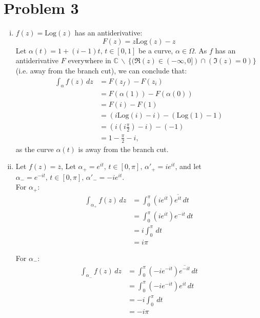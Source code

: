 \documentclass[a4paper, titlepage, DIV=14]{scrartcl}
\newcommand{\Log}{\text{Log}}
\begin{document}
    \section*{Problem 3}
    \begin{enumerate}[i)]
        \item 
        $f(z) = \Log(z)$ has an antiderivative:
        \begin{equation*}
            F(z) = z\Log(z) - z
        \end{equation*}
        Let $\alpha(t) = 1 + (i-1)t, \, t\in[0,1]$ be a curve, $\alpha\in\Omega$. As $f$ has an antiderivative $F$ everywhere in 
        $\mathbb{C} \, \backslash \, \{(\Re(z)\in(-\infty, 0]) \cap (\Im(z)= 0)\}$ (i.e. away from the branch cut), we can 
        conclude that:
        \begin{align*}
            \int_{\alpha} f(z) \, dz &= F(z_{f}) - F(z_{i}) \\
                &= F(\alpha(1)) - F(\alpha(0)) \\
                &= F(i) - F(1) \\
                &= (i\Log(i) - i) - (\Log(1) - 1) \\
                &= (i(i\frac{\pi}{2})-i) - (-1) \\
                &= 1 - \frac{\pi}{2} - i,
        \end{align*}as the curve $\alpha(t)$ is away from the branch cut.
        
        \item
        Let $f(z) = \overline{z}$, Let $\alpha_{+} = e^{it}, \, t\in[0,\pi], \, \alpha'_{+} = ie^{it}$, and let 
        $\alpha_{-} = e^{-it}, \, t\in[0,\pi], \, \alpha'_{-} = -ie^{it}$. \\
        For $\alpha_{+}$:
        \begin{align*}
            \int_{\alpha_{+}} f(z) \, dz &= \int_{0}^{\pi} (ie^{it})\overline{e^{it}} \, dt \\
                &= \int_{0}^{\pi} (ie^{it})e^{-it} \, dt \\
                &= i \int_{0}^{\pi}  \, dt \\
                &= i\pi
        \end{align*}

        For $\alpha_{-}$:
        \begin{align*}
            \int_{\alpha_{-}} f(z) \, dz &= \int_{0}^{\pi} (-ie^{-it})\overline{e^{-it}} \, dt \\
                &= \int_{0}^{\pi} (-ie^{-it})e^{it} \, dt \\
                &= -i \int_{0}^{\pi} \, dt \\
                &= -i\pi
        \end{align*}
    
    \end{enumerate}
\end{document}
